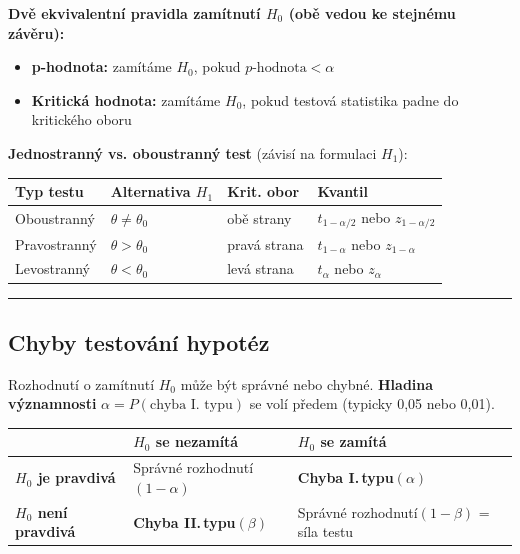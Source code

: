 \documentclass[a4paper, 11pt]{article}
\begin{document}
\medskip
\noindent\textbf{Dvě ekvivalentní pravidla zamítnutí $H_0$ (obě vedou ke stejnému závěru):}

\begin{itemize}[noitemsep]
	\item \textbf{p-hodnota:} zamítáme $H_0$, pokud $p\text{-hodnota} < \alpha$
	\item \textbf{Kritická hodnota:} zamítáme $H_0$, pokud testová statistika padne do kritického oboru
\end{itemize}

\medskip
\noindent\textbf{Jednostranný vs. oboustranný test} (závisí na formulaci $H_1$):

{\renewcommand{\arraystretch}{1.3}
\begin{tabular}{p{} p{} p{} p{}}
	\textbf{Typ testu} & \textbf{Alternativa $H_1$} & \textbf{Krit. obor} & \textbf{Kvantil} \\
	\midrule
	Oboustranný & $\theta \ne \theta_0$ & obě strany & $t_{1-\alpha/2}$ nebo $z_{1-\alpha/2}$ \\
	Pravostranný & $\theta > \theta_0$ & pravá strana & $t_{1-\alpha}$ nebo $z_{1-\alpha}$ \\
	Levostranný & $\theta < \theta_0$ & levá strana & $t_\alpha$ nebo $z_\alpha$ \\
\end{tabular}}

\noindent\hrule\medskip

\subsection{Chyby testování hypotéz}

Rozhodnutí o zamítnutí $H_0$ může být správné nebo chybné.
\textbf{Hladina významnosti} $\alpha = P(\text{chyba I. typu})$ se volí předem (typicky 0{,}05 nebo 0{,}01).

\medskip
{\renewcommand{\arraystretch}{1.6}
\begin{tabular}{p{} | p{} | p{}}
	& \textbf{$H_0$ se nezamítá} & \textbf{$H_0$ se zamítá} \\
	\hline
	\textbf{$H_0$ je pravdivá}
		& Správné rozhodnutí\newline$(1-\alpha)$
		& \textbf{Chyba I.\,typu}\newline$(\alpha)$ \\
	\hline
	\textbf{$H_0$ není pravdivá}
		& \textbf{Chyba II.\,typu}\newline$(\beta)$
		& Správné rozhodnutí\newline$(1-\beta)$ = síla testu \\
\end{tabular}}
\end{document}

